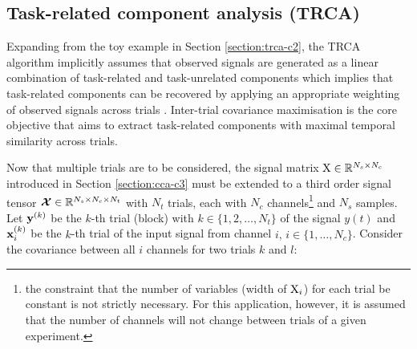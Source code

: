 \subsection{Task-related component analysis (TRCA)}
\label{sec:trca-c3}
Expanding from the toy example in Section \ref{section:trca-c2}, the TRCA algorithm implicitly assumes that observed signals are generated as a linear combination of task-related and task-unrelated components which implies that task-related components can be recovered by applying an appropriate weighting of observed signals across trials \cite{tanaka-trca}. Inter-trial covariance maximisation is the core objective that aims to extract task-related components with maximal temporal similarity across trials. 

Now that multiple trials are to be considered, the signal matrix ${\textrm{X}}\in \mathbb{R}^{N_s \times N_c}$ introduced in Section \ref{section:cca-c3} must be extended to a third order signal tensor ${\bm{\mathcal{X}}} \in \mathbb{R}^{N_s \times N_c \times N_t}$ with $N_t$ trials, each with $N_c$ channels\footnote{the constraint that the number of variables (width of ${\textrm{X}}_i$) for each trial be constant is not strictly necessary. For this application, however, it is assumed that the number of channels will not change between trials of a given experiment.} and $N_s$ samples. Let ${\mathbf{y}}^{(k)}$ be the $k$-th trial (block) with $k\in\{1, 2, \dots, N_t\}$ of the signal $y(t)$ and ${\mathbf{x}}_i^{(k)}$ be the $k$-th trial of the input signal from channel $i, \, i\in\{1, \dots, N_c\}$. Consider the covariance between all $i$ channels for two trials $k$ and $l$:

